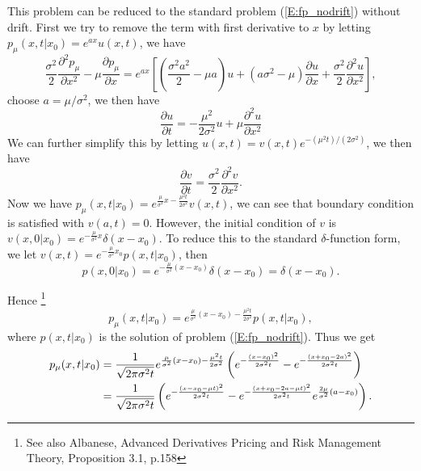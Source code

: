 This problem can be reduced to the standard problem (\ref{E:fp_nodrift}) without
drift. First we try to remove the term with first derivative to $x$ by letting
$p_{\mu}(x,t|x_0)=e^{ax} u(x,t)$, we have
\[
 \frac{\sigma^2}{2} \frac{\partial^2 p_{\mu}}{\partial x^2}
 - \mu \frac{\partial p_{\mu}}{\partial x}
 = e^{ax} \left[
   \left( \frac{\sigma^2 a^2}{2} - \mu a \right) u
   + (a \sigma^2 -\mu) \frac{\partial u}{\partial x}
   + \frac{\sigma^2}{2} \frac{\partial^2 u}{\partial x^2}
  \right],
\]
choose $a=\mu/\sigma^2$, we then have
\[
  \frac{\partial u}{\partial t} 
    = - \frac{\mu^2}{2 \sigma^2} u + \mu \frac{\partial^2 u}{\partial x^2}   
\]
We can further simplify this by letting 
$u(x,t)=v(x,t) e^{-(\mu^2 t)/(2\sigma^2)}$, we then have
\[
  \frac{\partial v}{\partial t} = 
    \frac{\sigma^2}{2} \frac{\partial^2 v}{\partial x^2}.
\]
Now we have
$p_{\mu}(x,t|x_0)=e^{\frac{\mu}{\sigma^2}x-\frac{\mu^2 t}{2\sigma^2}} v(x,t)$,
we can see that boundary condition is satisfied with $v(a,t)=0$. However, the
initial condition of $v$ is 
$v(x,0|x_0)=e^{-\frac{\mu}{\sigma^2} x} \delta(x-x_0)$. To reduce this to the
standard $\delta$-function form, we let 
$v(x,t)=e^{-\frac{\mu}{\sigma^2} x_0} p(x,t|x_0)$, then
\[
  p(x,0|x_0)=e^{-\frac{\mu}{\sigma^2} (x-x_0)} \delta(x-x_0)=\delta(x-x_0).
\]



Hence
\footnote{See also Albanese, Advanced Derivatives
   Pricing and Risk Management Theory, Proposition 3.1, p.158}
\begin{equation} 
  p_{\mu}(x,t|x_0) = e^{\frac{\mu}{\sigma^2}(x-x_0)-\frac{\mu^2 t}{2\sigma^2}} 
                     p(x,t|x_0),
\end{equation}
where $p(x,t|x_0)$ is the solution of problem (\ref{E:fp_nodrift}).
Thus we get
\begin{align} 
  p_{\mu}(x,t|x_0) 
    &= \frac{1}{\sqrt{2\pi \sigma^2 t}} 
       e^{\frac{\mu}{\sigma^2}(x-x_0)-\frac{\mu^2 t}{2\sigma^2}} 
       \left(  e^{-\frac{(x-x_0)^2}{2\sigma^2 t}} 
          - e^{-\frac{(x+x_0-2a)^2}{2\sigma^2 t}} \right)
       \\ \notag
    &= \frac{1}{\sqrt{2\pi \sigma^2 t}} 
       \left(  e^{-\frac{(x-x_0-\mu t)^2}{2\sigma^2 t}} 
             - e^{-\frac{(x+x_0-2a-\mu t)^2}{2\sigma^2 t}} 
               e^{\frac{2\mu}{\sigma^2} (a-x_0)}
       \right).
\end{align} 

